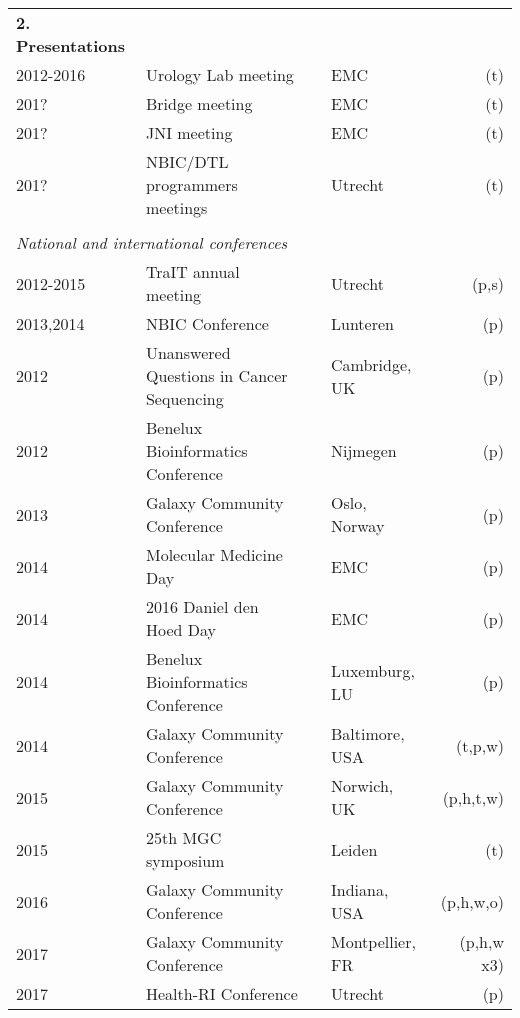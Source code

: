 \begin{table}
    \begin{tabular}{llp{1.4cm}lr}
        \textbf{2. Presentations} \\
        2012-2016 & Urology Lab meeting              && EMC         & (t) \\
        201?      & Bridge meeting                   && EMC         & (t) \\
        201?      & JNI meeting                      && EMC         & (t) \\
        201?      & NBIC/DTL programmers meetings    && Utrecht     & (t) \\
        \\
        \multicolumn{4}{l}{\textit{National and international conferences}} \\
        2012-2015 & TraIT annual meeting                   && Utrecht         & (p,s) \\
        2013,2014 & NBIC Conference                        && Lunteren        & (p) \\
        2012 & Unanswered Questions in Cancer Sequencing   && Cambridge, UK   & (p) \\
        2012 & Benelux Bioinformatics Conference           && Nijmegen        & (p) \\
        2013 & Galaxy Community Conference                 && Oslo, Norway    & (p) \\
        2014 & Molecular Medicine Day                      && EMC             & (p) \\
        2014 & 2016 Daniel den Hoed Day                    && EMC             & (p) \\
        2014 & Benelux Bioinformatics Conference           && Luxemburg, LU   & (p) \\
        2014 & Galaxy Community Conference                 && Baltimore, USA  & (t,p,w) \\
        2015 & Galaxy Community Conference                 && Norwich, UK     & (p,h,t,w) \\
        2015 & 25th MGC symposium                          && Leiden          & (t) \\
        2016 & Galaxy Community Conference                 && Indiana, USA    & (p,h,w,o) \\
        2017 & Galaxy Community Conference                 && Montpellier, FR & (p,h,w x3) \\
        2017 & Health-RI Conference                        && Utrecht         & (p) \\

\end{tabular}
\end{table}
